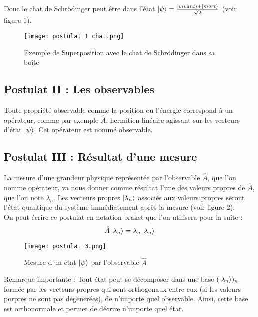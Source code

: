 \documentclass[11pt]{article}
\begin{document}
Donc le chat de Schrödinger peut être dans l'état \( \ket{\psi} = \frac{\ket{vivant} + \ket{mort}}{\sqrt{2}} \) (voir figure 1).

\begin{figure}[h]
 \caption{Exemple de Superposition avec le chat de Schrödinger dans sa boîte~\cite{figure}}
 \vspace{0.5cm}
 \texttt{[image: postulat 1 chat.png]}
 \centering
 \label{fig:superposition}
\end{figure}

\subsection{Postulat II : Les observables}

\qquad Toute propriété observable comme la position ou l'énergie correspond à un opérateur, comme par exemple \( \hat{A} \), hermitien linéaire agissant sur les vecteurs d'état \( \ket{\psi} \). Cet opérateur est nommé observable.


 \newpage
 
\subsection{Postulat III : Résultat d'une mesure}

La mesure d'une grandeur physique représentée par l'observable \( \hat{A} \), que l'on nomme opérateur, va nous donner comme résultat l'une des valeurs propres de \( \hat{A} \), que l'on note \( \lambda_n \). Les vecteurs propres \( \ket{\lambda_n} \) associés aux valeurs propres seront l'état quantique du système immédiatement après la mesure (voir figure 2).\\
On peut écrire ce postulat en notation braket que l'on utilisera pour la suite :
\[
\hat{A} \ket{\lambda_n} = \lambda_n \ket{\lambda_n}
\]

\begin{figure}[h]
 \caption{Mesure d'un état \( \ket{\psi} \) par l'observable \( \hat{A} \)~\cite{figure}}
 \vspace{0.5cm}
 \texttt{[image: postulat 3.png]}
 \centering
 \label{fig:mesure}
\end{figure}

Remarque importante : Tout état peut se décomposer dans une base \( (\ket{\lambda_n})_{n} \) formée par les vecteurs propres qui sont orthogonaux entre eux (si les valeurs porpres ne sont pas degenerées), de n'importe quel observable. Ainsi, cette base est orthonormale et permet de décrire n'importe quel état.
\end{document}
